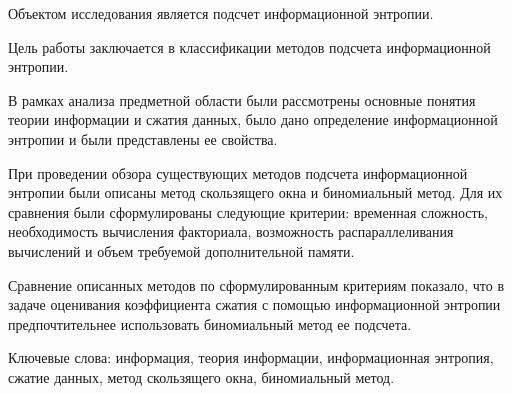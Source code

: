 \begin{essay}{}

Объектом исследования является подсчет информационной энтропии.

Цель работы заключается в классификации методов подсчета информационной энтропии.

В рамках анализа предметной области были рассмотрены основные понятия теории информации и сжатия данных, было дано определение информационной энтропии и были представлены ее свойства.

При проведении обзора существующих методов подсчета информационной энтропии были описаны метод скользящего окна и биномиальный метод. Для их сравнения были сформулированы следующие критерии: временная сложность, необходимость вычисления факториала, возможность распараллеливания вычислений и объем требуемой дополнительной памяти.

Сравнение описанных методов по сформулированным критериям показало, что в задаче оценивания коэффициента сжатия с помощью информационной энтропии предпочтительнее использовать биномиальный метод ее подсчета.

Ключевые слова: информация, теория информации, информационная энтропия, сжатие данных, метод скользящего окна, биномиальный метод.

\end{essay}